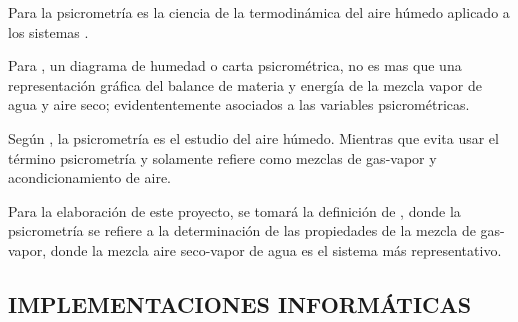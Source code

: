 Para \parencite[ p. 25]{SamuelC.Sugarman2007} la psicrometría es la ciencia de la termodinámica del aire húmedo aplicado a los sistemas . 




Para \textcite[]{Himmelblau2004}, un diagrama de humedad o carta psicrométrica, no es mas que una representación gráfica del balance de materia y energía de la mezcla vapor de agua y aire seco; evidententemente asociados a las variables psicrométricas.


Según \textcite[]{Martinez1992}, la psicrometría es el estudio del aire húmedo. Mientras que \textcite[]{YunusA.Cengel2015} evita usar el término psicrometría y solamente refiere como mezclas de gas-vapor y acondicionamiento de aire.    





Para la elaboración de este proyecto, se tomará la definición de \parencite[]{Perry2000}, donde la psicrometría se refiere a la determinación de las propiedades de la mezcla de gas-vapor, donde la mezcla aire seco-vapor de agua es el sistema más representativo.









\subsection*{IMPLEMENTACIONES INFORMÁTICAS}

